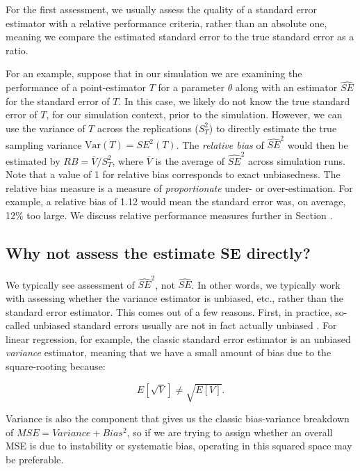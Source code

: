 \documentclass[
]{book}
\begin{document}
For the first assessment, we usually assess the quality of a standard error estimator with a relative performance criteria, rather than an absolute one, meaning we compare the estimated standard error to the true standard error as a ratio.

For an example, suppose that in our simulation we are examining the performance of a point-estimator \(T\) for a parameter \(\theta\) along with an estimator \(\widehat{SE}\) for the standard error of \(T\).
In this case, we likely do not know the true standard error of \(T\), for our simulation context, prior to the simulation.
However, we can use the variance of \(T\) across the replications (\(S_T^2\)) to directly estimate the true sampling variance \(\text{Var}(T) = SE^2(T)\).
The \emph{relative bias} of \(\widehat{SE}^2\) would then be estimated by \(RB = \bar{V} / S_T^2\), where \(\bar{V}\) is the average of \(\widehat{SE}^2\) across simulation runs.
Note that a value of 1 for relative bias corresponds to exact unbiasedness.
The relative bias measure is a measure of \emph{proportionate} under- or over-estimation.
For example, a relative bias of 1.12 would mean the standard error was, on average, 12\% too large.
We discuss relative performance measures further in Section \citet{sec_relative_performance}.

\hypertarget{why-not-assess-the-estimate-se-directly}{%
\subsection{Why not assess the estimate SE directly?}\label{why-not-assess-the-estimate-se-directly}}

We typically see assessment of \(\widehat{SE}^2\), not \(\widehat{SE}\).
In other words, we typically work with assessing whether the variance estimator is unbiased, etc., rather than the standard error estimator.
This comes out of a few reasons.
First, in practice, so-called unbiased standard errors usually are not in fact actually unbiased \citet{GerberGreen}.
For linear regression, for example, the classic standard error estimator is an unbiased \emph{variance} estimator, meaning that we have a small amount of bias due to the square-rooting because:

\[ E[ \sqrt{ V } ] \neq \sqrt{ E[ V ] } . \]

Variance is also the component that gives us the classic bias-variance breakdown of \(MSE = Variance + Bias^2\), so if we are trying to assign whether an overall MSE is due to instability or systematic bias, operating in this squared space may be preferable.
\end{document}
